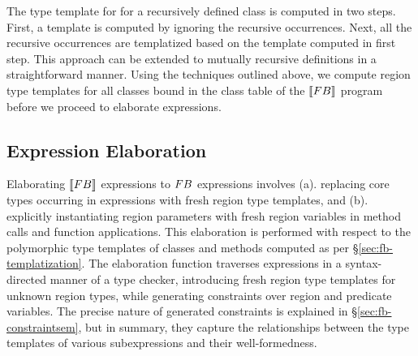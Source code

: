 The type template for for a recursively defined class is computed in
two steps. First, a template is computed by ignoring the recursive
occurrences. Next, all the recursive occurrences are templatized based
on the template computed in first step.  This approach can be extended
to mutually recursive definitions in a straightforward manner. Using
the techniques outlined above, we compute region type templates for
all classes bound in the class table of the $\llbracket {\sc FB} \rrbracket$ program
before we proceed to elaborate expressions.




\subsection{Expression Elaboration}

Elaborating $\llbracket {\sc FB} \rrbracket$ expressions to ${\sc FB}$ expressions involves
(a). replacing core types occurring in expressions with fresh region
type templates, and (b). explicitly instantiating region parameters
with fresh region variables in method calls and function applications.
This elaboration is performed with respect to the polymorphic type
templates of classes and methods computed as per
\S\ref{sec:fb-templatization}. The elaboration function traverses
expressions in a syntax-directed manner of a type checker, introducing
fresh region type templates for unknown region types, while generating
constraints over region and predicate variables. The precise nature of
generated constraints is explained in \S\ref{sec:fb-constraintsem},
but in summary, they capture the relationships between the type
templates of various subexpressions and their well-formedness.

